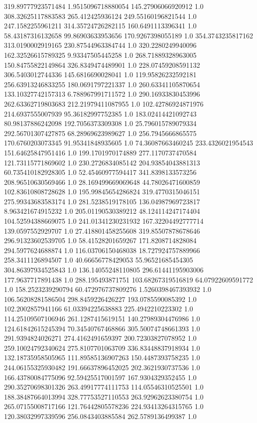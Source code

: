 319.89777923571484	1.9515096718880054	145.27906066920912	1.0
308.32625117883583	265.412425936124	249.55160196821544	1.0
247.1582255961211	314.35724726282115	160.6491113396341	1.0
58.43187316132658	99.86903633953656	170.9267398055189	1.0
354.3743235817162	313.0190002919165	230.87544963384744	1.0
320.2280249940096	162.32526615789325	9.93347505445258	1.0
268.71889328963005	150.84755822149864	326.8349474489901	1.0
228.07459208591132	306.5403012744336	145.6816690028041	1.0
119.95826232592181	256.63913246833255	180.0691797221337	1.0
260.63341105870654	133.10327742157313	6.788967991711572	1.0
290.16933830453996	262.63362719803683	212.21979411087955	1.0
102.42786924871976	214.6937555007939	95.36182997752385	1.0
183.02414421092743	80.98137886242098	192.7056373309308	1.0
25.796015789079334	292.56701307427875	68.28969623989627	1.0
256.7945666865575	170.6760203073345	91.95341848935605	1.0
74.36087663460245	233.4326021954543	151.64625847951416	1.0
199.1701970174889	277.1170737470584	121.73115771869602	1.0
230.2726834085142	204.93854043881313	60.735410182928305	1.0
52.45460977594417	341.8398133573256	208.96510630569466	1.0
28.169499669069648	44.78026471600859	102.83610808728628	1.0
195.99845654286824	319.4770315046151	275.99343683583174	1.0
281.5238519178105	136.04987969723817	8.963421674915232	1.0
205.01190530389212	48.124114247174404	104.52594388669075	1.0
241.01341230231932	167.32204492777714	139.0597552929707	1.0
27.418801458255608	319.85507878678646	296.91323602539705	1.0
58.41528201659267	171.8208714828084	294.5977624688874	1.0
116.03706150468038	18.727924757889966	258.3411126894507	1.0
40.66656778429053	55.96521685454305	304.86397934525843	1.0
136.14055248110805	296.61441195903006	177.9637717891438	1.0
288.195493871751	103.68267319516819	64.07922609591772	1.0
158.2523239290794	60.472976737809276	1.5260398467393932	1.0
106.56208281586504	298.8459226426227	193.0785590085392	1.0
102.2002857941166	61.03394225638883	225.4942210223302	1.0
114.25109507106946	261.1287415619151	140.27989304476986	1.0
124.61842615245394	70.34540767468866	305.50074748661393	1.0
291.9394824026271	274.4162491659397	200.72303827078952	1.0
259.10024792340624	275.8107701063709	336.83448837918934	1.0
132.18735958505965	111.89585136907263	150.4487393758235	1.0
244.06155325930482	191.66637896452025	202.3621930737536	1.0
166.43780084775096	92.59425517001597	167.9304329352455	1.0
290.35270698301326	263.49917774111753	114.05546310525501	1.0
188.38487664013994	328.77753527110553	263.92962623380754	1.0
265.07155008717166	121.76442805578236	224.93413264315765	1.0
120.38032997339596	256.0843403885584	262.5789136499387	1.0
